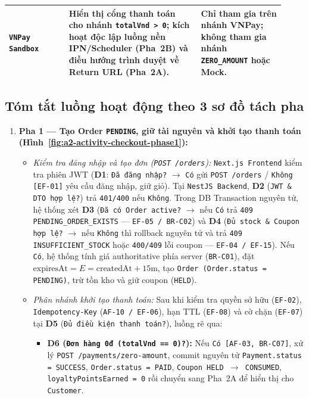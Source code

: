 \begin{longtable}{>{\raggedright\arraybackslash}p{0.20\linewidth}>{\raggedright\arraybackslash}p{0.44\linewidth}>{\raggedright\arraybackslash}p{0.28\linewidth}}
\texttt{VNPay Sandbox} & Hiển thị cổng thanh toán cho nhánh \texttt{totalVnd > 0}; kích hoạt độc lập luồng nền IPN/Scheduler (Pha~2B) và điều hướng trình duyệt về Return URL (Pha~2A). & Chỉ tham gia trên nhánh VNPay; không tham gia nhánh \texttt{ZERO\_AMOUNT} hoặc Mock. \\ \hline
\end{longtable}
\endgroup

\subsection{Tóm tắt luồng hoạt động theo 3 sơ đồ tách pha}

\begin{enumerate}
  \item \textbf{Pha 1 --- Tạo Order \texttt{PENDING}, giữ tài nguyên và khởi tạo thanh toán (Hình~\ref{fig:a2-activity-checkout-phase1}):}
  \begin{itemize}
    \item \emph{Kiểm tra đăng nhập và tạo đơn (\texttt{POST /orders}):} \texttt{Next.js Frontend} kiểm tra phiên JWT (\textbf{D1}: \texttt{Đã đăng nhập?} \(\rightarrow\) \texttt{Có} gửi \texttt{POST /orders} / \texttt{Không [EF-01]} yêu cầu đăng nhập, giữ giỏ). Tại \texttt{NestJS Backend}, \textbf{D2} (\texttt{JWT \& DTO hợp lệ?}) trả \texttt{401/400} nếu \texttt{Không}. Trong DB Transaction nguyên tử, hệ thống xét \textbf{D3} (\texttt{Đã có Order active?} \(\rightarrow\) nếu \texttt{Có} trả \texttt{409 PENDING\_ORDER\_EXISTS} --- \texttt{EF-05 / BR-C02}) và \textbf{D4} (\texttt{Đủ stock \& Coupon hợp lệ?} \(\rightarrow\) nếu \texttt{Không} thì rollback nguyên tử và trả \texttt{409 INSUFFICIENT\_STOCK} hoặc \texttt{400/409} lỗi coupon --- \texttt{EF-04 / EF-15}). Nếu \texttt{Có}, hệ thống tính giá authoritative phía server (\texttt{BR-C01}), đặt \(\text{expiresAt} = E = \text{createdAt} + 15\text{m}\), tạo \texttt{Order (Order.status = PENDING)}, trừ tồn kho và giữ coupon (\texttt{HELD}).
    \item \emph{Phân nhánh khởi tạo thanh toán:} Sau khi kiểm tra quyền sở hữu (\texttt{EF-02}), \texttt{Idempotency-Key} (\texttt{AF-10 / EF-06}), hạn TTL (\texttt{EF-08}) và cờ chặn (\texttt{EF-07}) tại \textbf{D5} (\texttt{Đủ điều kiện thanh toán?}), luồng rẽ qua:
    \begin{itemize}
      \item \textbf{D6 (\texttt{Đơn hàng 0đ (totalVnd == 0)?}):} Nếu \texttt{Có [AF-03, BR-C07]}, xử lý \texttt{POST /payments/zero-amount}, commit nguyên tử \texttt{Payment.status = SUCCESS}, \texttt{Order.status = PAID}, \texttt{Coupon HELD \(\rightarrow\) CONSUMED}, \texttt{loyaltyPointsEarned = 0} rồi chuyển sang Pha~2A để hiển thị cho \texttt{Customer}.

\end{itemize}
\end{itemize}
\end{enumerate}
